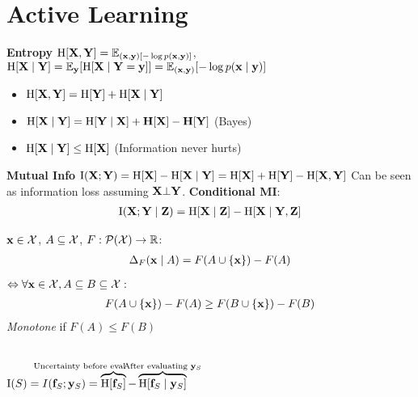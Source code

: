 \section{Active Learning}

\begin{colored}
    \textbf{Entropy}
    \(\operatorname{H}[\vb{X}, \vb{Y}] = \mathbb{E}_{(\vb{x},\vb{y})[-\log p(\vb{x}, \vb{y})]}\),
    \(\operatorname{H}[\vb{X}\mid\vb{Y}] = \mathbb{E}_{\vb{y}}[\operatorname{H}[\vb{X} \mid \vb{Y} = \vb{y}]] = \mathbb{E}_{(\vb{x},\vb{y})}[-\log p(\vb{x} \mid \vb{y})]\)
    \begin{itemize}
        \item \(\operatorname{H}[\vb{X}, \vb{Y}] = \operatorname{H}[\vb{Y}] + \operatorname{H}[\vb{X} \mid \vb{Y}]\)
        \item \(\operatorname{H}[\vb{X} \mid \vb{Y}] = \operatorname{H}[\vb{Y} \mid \vb{X}] + \vb{H}[\vb{X}] - \vb{H}[\vb{Y}]\) (Bayes)
        \item \(\operatorname{H}[\vb{X}\mid\vb{Y}] \leq \operatorname{H}[\vb{X}]\) (Information never hurts)
    \end{itemize}
\end{colored}

\begin{colored}
    \textbf{Mutual Info}
    \(\operatorname{I}(\vb{X}; \vb{Y}) = \operatorname{H}[\vb{X}] - \operatorname{H}[\vb{X} \mid \vb{Y}] = \operatorname{H}[\vb{X}] + \operatorname{H}[\vb{Y}] - \operatorname{H}[\vb{X}, \vb{Y}]\)
    Can be seen as information loss assuming \(\vb{X} \bot \vb{Y}\).
    \textbf{Conditional MI}:
    \begin{gather*}
        \operatorname{I}(\vb{X}; \vb{Y} \mid \vb{Z}) = \operatorname{H}[\vb{X} \mid \vb{Z}] - \operatorname{H}[\vb{X} \mid \vb{Y}, \vb{Z}]
    \end{gather*}
\end{colored}

\begin{definition}
    \(\vb{x} \in \operatorname{\mathcal{X}}\), \( A\subseteq \operatorname{\mathcal{X}}\), \(F: \mathcal{P}(\operatorname{\mathcal{X}}) \to \mathbb{R}\):
    \begin{gather*}
    \Delta_F(\vb{x} \mid A) = F(A \cup \{\vb{x}\}) - F(A) \\
    \end{gather*}
\end{definition}

\vspace{-15pt}
\begin{definition}[Submodular]
    \(\Leftrightarrow \forall \vb{x} \in \operatorname{\mathcal{X}}, A \subseteq B \subseteq \operatorname{\mathcal{X}}:\)
    \begin{gather*}
        F(A \cup \{\vb{x}\}) - F(A) \geq F(B \cup \{\vb{x}\}) - F(B)
    \end{gather*}
    \textit{Monotone} if \(F(A) \leq F(B)\)
\end{definition}

\begin{definition}\ \\
    \(\MI(S) = I(\f_S; \y_S) = \overbrace{\Ent[\f_S]}^{\mathclap{\hspace{-60pt}\text{Uncertainty before eval}}} - \overbrace{\Ent[\f_S \mid \y_S]}^{\mathclap{\text{After evaluating } \y_S}}\)
\end{definition}

